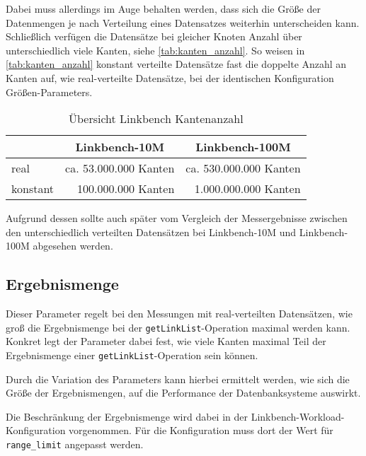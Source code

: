 Dabei muss allerdings im Auge behalten werden, dass sich die Größe der Datenmengen je nach Verteilung eines Datensatzes weiterhin unterscheiden kann. Schließlich verfügen die Datensätze bei gleicher Knoten Anzahl über unterschiedlich viele Kanten, siehe \autoref{tab:kanten_anzahl}. So weisen in \autoref{tab:kanten_anzahl} konstant verteilte Datensätze fast die doppelte Anzahl an Kanten auf, wie real-verteilte Datensätze, bei der identischen Konfiguration Größen-Parameters. 

\begin{table}[ht]
    \centering
    \begin{tabular}{l|r|r}
    \hline
    \rowcolor[HTML]{EFEFEF} 
    \multicolumn{1}{c|}{\cellcolor[HTML]{EFEFEF}\textbf{Verteilung}} & \multicolumn{1}{c|}{\cellcolor[HTML]{EFEFEF}\textbf{Linkbench-10M}} & \multicolumn{1}{c}{\cellcolor[HTML]{EFEFEF}\textbf{Linkbench-100M}} \\ \hline
    real & ca. 53.000.000 Kanten & ca. 530.000.000 Kanten \\
    konstant & 100.000.000 Kanten & 1.000.000.000 Kanten \\ \hline
    \end{tabular}
    \caption{Übersicht Linkbench Kantenanzahl}
    \label{tab:kanten_anzahl}
    \vspace{1em}
    \textit{}
\end{table}

Aufgrund dessen sollte auch später vom Vergleich der Messergebnisse zwischen den unterschiedlich verteilten Datensätzen bei Linkbench-10M und Linkbench-100M abgesehen werden.

\subsection{Ergebnismenge}
Dieser Parameter regelt bei den Messungen mit real-verteilten Datensätzen, wie groß die Ergebnismenge bei der \texttt{getLinkList}-Operation maximal werden kann. Konkret legt der Parameter dabei fest, wie viele Kanten maximal Teil der Ergebnismenge einer \texttt{getLinkList}-Operation sein können.

Durch die Variation des Parameters kann hierbei ermittelt werden, wie sich die Größe der Ergebnismengen, auf die Performance der Datenbanksysteme auswirkt. 

Die Beschränkung der Ergebnismenge wird dabei in der Linkbench-Workload-Konfiguration vorgenommen. Für die Konfiguration muss dort der Wert für \texttt{range\_limit} angepasst werden. 

